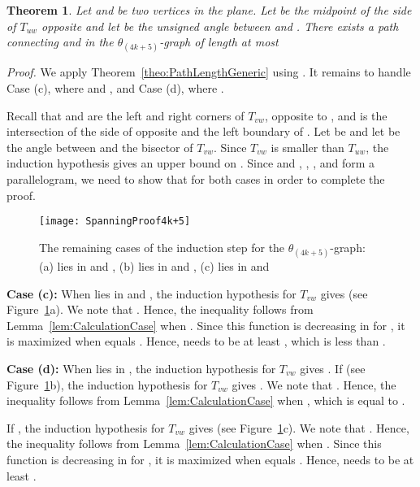\documentclass[12pt]{article}
\newtheorem{theo}[defin]{Theorem}
\newenvironment{theorem}{\begin{theo} \sl}{\end{theo}}
\newenvironment{proof}{\emph{Proof.}}{\hfill \\}
\newcommand{\graph}[1]{\ensuremath{\theta_{(4 k + #1)}}-graph\xspace}
\newcommand{\canon}[2]{\ensuremath{T_{#1 #2}}}
\begin{document}
\begin{theorem}
  \label{theo:PathLength4k+5}
  Let  and  be two vertices in the plane. Let  be the midpoint of the side of \canon{u}{w} opposite  and let  be the unsigned angle between  and . There exists a path connecting  and  in the \graph{5} of length at most 
   
\end{theorem}
\begin{proof}
  We apply Theorem~\ref{theo:PathLengthGeneric} using . It remains to handle Case (c), where  and , and Case (d), where . 

  Recall that  and  are the left and right corners of \canon{v}{w}, opposite to , and  is the intersection of the side of  opposite  and the left boundary of . Let  be  and let  be the angle between  and the bisector of \canon{v}{w}. Since \canon{v}{w} is smaller than \canon{u}{w}, the induction hypothesis gives an upper bound on . Since  and , , , and  form a parallelogram, we need to show that  for both cases in order to complete the proof. 

  \begin{figure}[ht]
    \begin{center}
      \texttt{[image: SpanningProof4k+5]}
    \end{center}
    \caption{The remaining cases of the induction step for the \graph{5}: (a)  lies in  and , (b)  lies in  and , (c)  lies in  and }
    \label{fig:SpanningProof4k+5}
  \end{figure}

  \textbf{Case (c):} When  lies in  and , the induction hypothesis for \canon{v}{w} gives  (see Figure~\ref{fig:SpanningProof4k+5}a). We note that . Hence, the inequality follows from Lemma~\ref{lem:CalculationCase} when . Since this function is decreasing in  for , it is maximized when  equals . Hence,  needs to be at least , which is less than . 

  \textbf{Case (d):} When  lies in , the induction hypothesis for \canon{v}{w} gives . If  (see Figure~\ref{fig:SpanningProof4k+5}b), the induction hypothesis for \canon{v}{w} gives . We note that . Hence, the inequality follows from Lemma~\ref{lem:CalculationCase} when , which is equal to . 

  If , the induction hypothesis for \canon{v}{w} gives  (see Figure~\ref{fig:SpanningProof4k+5}c). We note that . Hence, the inequality follows from Lemma~\ref{lem:CalculationCase} when . Since this function is decreasing in  for , it is maximized when  equals . Hence,  needs to be at least .
\end{proof}
\end{document}
